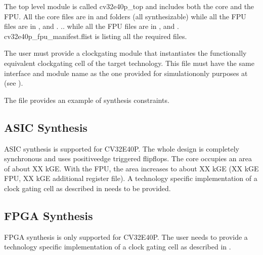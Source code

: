 \documentclass[letterpaper,10pt,english]{sphinxmanual}
\begin{document}
\sphinxAtStartPar
The top level module is called cv32e40p\_top and includes both the core and the FPU.
All the core files are in  and  folders (all synthesizable)
while all the FPU files are in ,  and .
.. while all the FPU files are in ,  and .
cv32e40p\_fpu\_manifest.flist is listing all the required files.

\sphinxAtStartPar
The user must provide a clock\sphinxhyphen{}gating module that instantiates the functionally equivalent clock\sphinxhyphen{}gating cell of the target technology.
This file must have the same interface and module name as the one provided for simulation\sphinxhyphen{}only purposes at  (see {\hyperref[\detokenize{integration:clock-gating-cell}]{}}).

\sphinxAtStartPar
The  file provides an example of synthesis constraints.


\subsection{ASIC Synthesis}
\label{\detokenize{integration:asic-synthesis}}
\sphinxAtStartPar
ASIC synthesis is supported for CV32E40P. The whole design is completely
synchronous and uses positive\sphinxhyphen{}edge triggered flip\sphinxhyphen{}flops. The
core occupies an area of about XX kGE.
With the FPU, the area increases to about XX kGE (XX kGE
FPU, XX kGE additional register file). A technology specific implementation
of a clock gating cell as described in {\hyperref[\detokenize{integration:clock-gating-cell}]{}} needs to
be provided.


\subsection{FPGA Synthesis}
\label{\detokenize{integration:fpga-synthesis}}
\sphinxAtStartPar
FPGA synthesis is only supported for CV32E40P.
The user needs to provide a technology specific implementation of a clock gating cell as described
in {\hyperref[\detokenize{integration:clock-gating-cell}]{}}.
\end{document}
